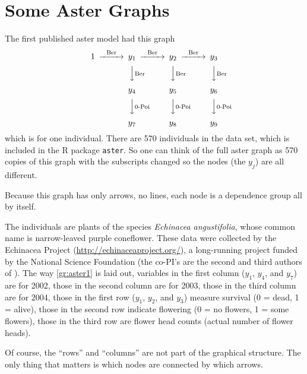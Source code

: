 \section{Some Aster Graphs}
\label{sec:graphs}

The first published aster model \citep{aster1} had this graph
\begin{equation} \label{gr:aster1}
\begin{CD}
   1
   @>\text{Ber}>>
   y_1
   @>\text{Ber}>>
   y_2
   @>\text{Ber}>>
   y_3
   \\
   @.
   @VV\text{Ber}V
   @VV\text{Ber}V
   @VV\text{Ber}V
   \\
   \hphantom{1}
   @.
   y_4
   @.
   y_5
   @.
   y_6
   \\
   @.
   @VV\text{0-Poi}V
   @VV\text{0-Poi}V
   @VV\text{0-Poi}V
  \\
   \hphantom{1}
   @.
   y_7
   @.
   y_8
   @.
   y_9
\end{CD}
\end{equation}
which is for one individual.  There are 570 individuals in the data set,
which is included in the R package \texttt{aster}.  So one can think of the
full aster graph as 570 copies of this graph with the subscripts changed
so the nodes (the $y_j$) are all different.

Because this graph has only arrows, no lines, each node is
a dependence group all by itself.

The individuals are plants of the species \emph{Echinacea angustifolia},
whose common name is narrow-leaved
purple coneflower.  These data were collected by the Echinacea Project
(\url{http://echinaceaproject.org/}), a long-running project funded by
the National Science Foundation (the co-PI's are the second and third authors
of \citet{aster1}).  The way \eqref{gr:aster1} is laid out,
variables in the first column ($y_1$, $y_4$, and $y_7$) are for 2002,
those in the second column are for 2003,
those in the third column are for 2004,
those in the first row ($y_1$, $y_2$, and $y_3$) measure survival
(0 = dead, 1 = alive),
those in the second row indicate flowering
(0 = no flowers, 1 = some flowers),
those in the third row are flower head counts
(actual number of flower heads).

Of course,
the ``rows'' and ``columns'' are not part of the graphical structure.
The only thing that matters is which nodes are connected by which arrows.

